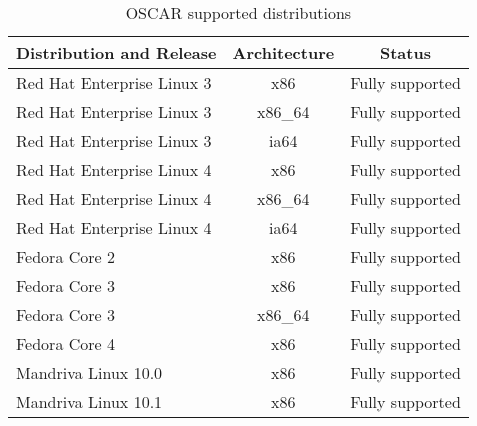 %
%
%

\begin{table}[htbp]
  \begin{center}
    \begin{tabular}{|l|c|p{3in}|}
      \hline
      \multicolumn{1}{|c|}{Distribution and Release} &
      \multicolumn{1}{|c|}{Architecture} &
      \multicolumn{1}{|c|}{Status} \\
      \hline
      \hline
%
      Red Hat Enterprise Linux 3 & x86 & Fully supported \\
      Red Hat Enterprise Linux 3 & x86\_64 & Fully supported \\
      Red Hat Enterprise Linux 3 & ia64 & Fully supported \\
      Red Hat Enterprise Linux 4 & x86 & Fully supported \\
      Red Hat Enterprise Linux 4 & x86\_64 & Fully supported \\
      Red Hat Enterprise Linux 4 & ia64 & Fully supported \\
%
\hline
%
      Fedora Core 2 & x86 & Fully supported \\
      Fedora Core 3 & x86 & Fully supported \\
      Fedora Core 3 & x86\_64 & Fully supported \\
      Fedora Core 4 & x86 & Fully supported \\
%
\hline
%
      Mandriva Linux 10.0 & x86 & Fully supported \\
      Mandriva Linux 10.1 & x86 & Fully supported \\
%
\hline
%
    \end{tabular}
    \caption{OSCAR supported distributions}
    \label{tab:oscar-distro-support}
  \end{center}
\end{table}
